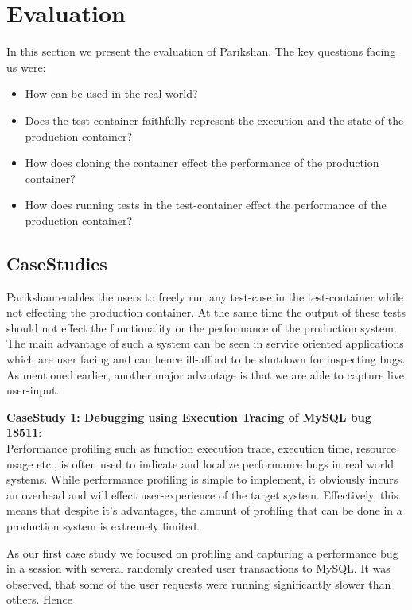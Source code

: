 \section{Evaluation}
\label{sec:evaluation}
In this section we present the evaluation of Parikshan. 
The key questions facing us were:
\begin{itemize}
  \item How can \parikshan be used in the real world? 
  \item Does the test container faithfully represent the execution and the state of the production container? 
   \item How does cloning the container effect the performance of the production container?
   \item How does running tests in the test-container effect the performance of the production container? 
\end{itemize}

\subsection{CaseStudies}
\label{sec:casestudy}

Parikshan enables the users to freely run any test-case in the test-container while not effecting the production container. 
At the same time the output of these tests should not effect the functionality or the performance of the production system.
The main advantage of such a system can be seen in service oriented applications which are user facing and can hence ill-afford to be shutdown for inspecting bugs.
As mentioned earlier, another major advantage is that we are able to capture live user-input. \\

\par \noindent \textbf{CaseStudy 1: Debugging using Execution Tracing of MySQL bug 18511}: \\ 
Performance profiling such as function execution trace, execution time, resource usage etc., is often used to indicate and localize performance bugs in real world systems. 
While performance profiling is simple to implement, it obviously incurs an overhead and will effect user-experience of the target system.
Effectively, this means that despite it's advantages, the amount of profiling that can be done in a production system is extremely limited. 

As our first case study we focused on profiling and capturing a performance bug in a session with several randomly created user transactions to MySQL. 
It was observed, that some of the user requests were running significantly slower than others. 
Hence 

